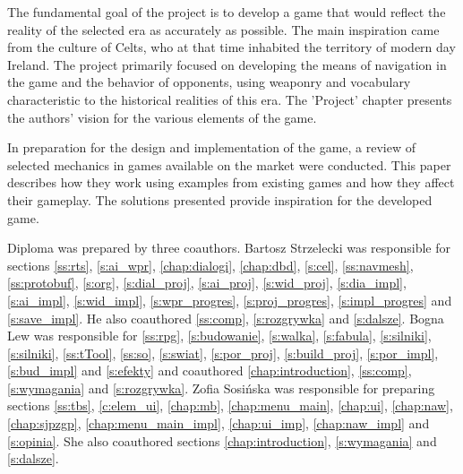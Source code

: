 The fundamental goal of the project is to develop a game that would reflect the reality of the selected era as accurately as possible.
The main inspiration came from the culture of Celts, who at that time inhabited the territory of modern day Ireland.
The project primarily focused on
developing the means of navigation in the game and the behavior of opponents, using weaponry and vocabulary characteristic to the
historical realities of this era. The 'Project' chapter presents the authors' vision for the various elements of the game.

In preparation for the design and implementation of the game, a review of selected mechanics in games available
on the market were conducted. This paper describes how they work using examples from existing games and how
they affect their gameplay. The solutions presented provide inspiration for the developed game.

Diploma was prepared by three coauthors. Bartosz Strzelecki was responsible for sections \ref{ss:rts},
\ref{s:ai_wpr}, \ref{chap:dialogi}, \ref{chap:dbd}, \ref{s:cel}, \ref{ss:navmesh}, \ref{ss:protobuf}, \ref{s:org},
\ref{s:dial_proj}, \ref{s:ai_proj}, \ref{s:wid_proj}, \ref{s:dia_impl}, \ref{s:ai_impl}, \ref{s:wid_impl}, \ref{s:wpr_progres}, \ref{s:proj_progres}, \ref{s:impl_progres} and
\ref{s:save_impl}. He also coauthored \ref{ss:comp}, \ref{s:rozgrywka} and \ref{s:dalsze}. Bogna Lew
was responsible for \ref{ss:rpg}, \ref{s:budowanie}, \ref{s:walka}, \ref{s:fabula}, \ref{s:silniki}, \ref{s:silniki},
\ref{ss:tTool}, \ref{ss:so}, \ref{s:swiat}, \ref{s:por_proj}, \ref{s:build_proj}, \ref{s:por_impl}, \ref{s:bud_impl} and
\ref{s:efekty} and coauthored \ref{chap:introduction}, \ref{ss:comp}, \ref{s:wymagania} and \ref{s:rozgrywka}.
Zofia Sosińska was responsible for preparing sections \ref{ss:tbs}, \ref{c:elem_ui}, \ref{chap:mb},
\ref{chap:menu_main}, \ref{chap:ui}, \ref{chap:naw}, \ref{chap:sjpzgp}, \ref{chap:menu_main_impl}, \ref{chap:ui_imp},
\ref{chap:naw_impl} and  \ref{s:opinia}. She also coauthored sections \ref{chap:introduction}, \ref{s:wymagania} and \ref{s:dalsze}.
